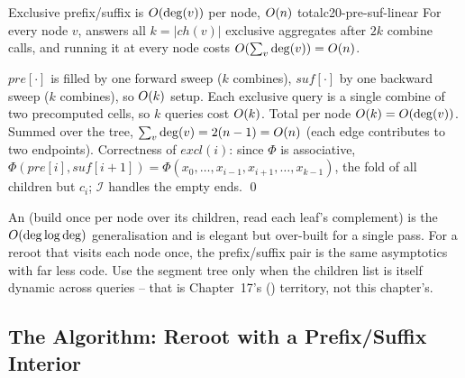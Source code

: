 \begin{theorem}{Exclusive prefix/suffix is $O(\deg(v))$ per node, $O(n)$ total}{c20-pre-suf-linear}
For every node $v$,  answers all $k=\lvert\mathit{ch}(v)\rvert$
exclusive aggregates after $2k$ combine calls, and running it at every node
costs $O(\sum_v \deg(v)) = O(n)$.
\end{theorem}

\begin{proofbox}
$\mathit{pre}[\cdot]$ is filled by one forward sweep ($k$ combines),
$\mathit{suf}[\cdot]$ by one backward sweep ($k$ combines), so $O(k)$ setup.
Each exclusive query is a single combine of two precomputed cells, so $k$
queries cost $O(k)$. Total per node $O(k)=O(\deg(v))$. Summed over
the tree, $\sum_v \deg(v) = 2(n-1) = O(n)$ (each edge contributes to two
endpoints). Correctness of $\mathit{excl}(i)$: since $\Phi$ is associative,
$\Phi(\mathit{pre}[i],\mathit{suf}[i{+}1]) = \Phi(x_0,\dots,x_{i-1},x_{i+1},
\dots,x_{k-1})$, the fold of all children but $c_i$; $\mathcal{I}$ handles the
empty ends. \qed
\end{proofbox}

\begin{insightbox}
An  (build once per node over its children, read
each leaf's complement) is the $O(\deg\log\deg)$ generalisation and is
elegant but over-built for a single pass. For a reroot that visits each node
once, the prefix/suffix pair is the same asymptotics with far less code. Use the
segment tree only when the children list is itself dynamic across queries --
that is Chapter~17's () territory, not this chapter's.
\end{insightbox}

\subsection{The Algorithm: Reroot with a Prefix/Suffix Interior}

